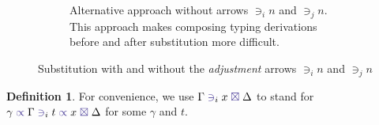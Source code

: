 \documentclass[a4paper,UKenglish,cleveref,autoref,thm-restate,authorcolumns]{lipics-v2019}
\theoremstyle{definition}
\newtheorem{nidefinition}[theorem]{Definition}
\newcommand{\type}[1]{\textcolor{BlueViolet}{\operatorname{#1}}}
\newcommand{\contains}[6]{#1 \; \type{\propto} \; #2 \; \type{\ni}_{#3} \; #4 \; \type{\propto} \; #5 \; \type{\boxtimes} \; #6}
\newcommand{\containsusage}[4]{#1 \; \type{\ni}_{#2} \; #3 \; \type{\boxtimes} \; #4}
\begin{document}
\begin{figure}[h]
\begin{subfigure}{.4\textwidth}
    \caption{
      Alternative approach without arrows $\ni_i n$ and $\ni_j n$.
      This approach makes composing typing derivations before and after substitution more difficult.
    }
    \label{fig:subst-alternative}
  \end{subfigure}
  \caption{Substitution with and without the \emph{adjustment} arrows $\ni_i n$ and $\ni_j n$}
\end{figure}

\begin{nidefinition}
  For convenience, we use $\containsusage{\Gamma}{i}{x}{\Delta}$ to stand for $\contains{\gamma}{\Gamma}{i}{t}{x}{\Delta}$ for some $\gamma$ and $t$.
\end{nidefinition}
  
\end{document}
